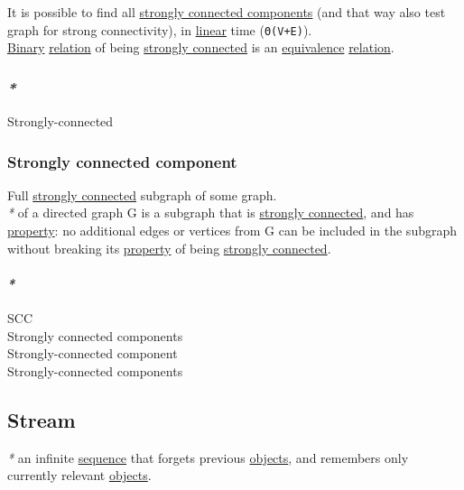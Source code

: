 \documentclass[11pt]{article}
\begin{document}
It is possible to find all \hyperref[orgbe7dabb]{strongly connected components} (and that way also test graph for strong connectivity), in \hyperref[orgb55e183]{linear} time (\texttt{Θ(V+E)}).\\

\hyperref[orgee106ab]{Binary} \hyperref[org6e8ae46]{relation} of being \hyperref[orgc84d9f9]{strongly connected} is an \hyperref[orgad1fc87]{equivalence} \hyperref[org6e8ae46]{relation}.\\

\subsubsection{\emph{*}}
\label{sec:orgd099615}

\label{org4082a80}Strongly-connected\\

\subsubsection{\label{org10bd417}Strongly connected component}
\label{sec:org5b86086}
Full \hyperref[orgc84d9f9]{strongly connected} subgraph of some graph.\\

\emph{*} of a directed graph G is a subgraph that is \hyperref[orgc84d9f9]{strongly connected}, and has \hyperref[org07ca26b]{property}: no additional edges or vertices from G can be included in the subgraph without breaking its \hyperref[org07ca26b]{property} of being \hyperref[orgc84d9f9]{strongly connected}.\\

\paragraph{\emph{*}}
\label{sec:orgc165308}

\label{orgee82abe}SCC\\
\label{orgbe7dabb}Strongly connected components\\
\label{org13993ce}Strongly-connected component\\
\label{orge674056}Strongly-connected components\\

\subsection{\label{orgafcaa02}Stream}
\label{sec:org447434d}
\emph{*} an infinite \hyperref[orgf90a45c]{sequence} that forgets previous \hyperref[orge0f000f]{objects}, and remembers only currently relevant \hyperref[orge0f000f]{objects}.\\
\end{document}

